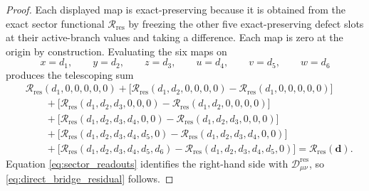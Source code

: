 \documentclass[11pt]{article}
\newcommand{\ResidualDec}{\mathcal D_{\mu\nu}^{\mathrm{res}}}
\newcommand{\ResidualRead}{\mathscr R_{\mathrm{res}}}
\begin{document}
\begin{proof}
Each displayed map is exact-preserving because it is obtained from the exact sector functional \(\ResidualRead\) by freezing the other five exact-preserving defect slots at their active-branch values and taking a difference. Each map is zero at the origin by construction. Evaluating the six maps on
\[
x=d_1,\qquad
y=d_2,\qquad
z=d_3,\qquad
u=d_4,\qquad
v=d_5,\qquad
w=d_6
\]
produces the telescoping sum
\[
\begin{aligned}
&\ResidualRead(d_1,0,0,0,0,0)
+\bigl[\ResidualRead(d_1,d_2,0,0,0,0)-\ResidualRead(d_1,0,0,0,0,0)\bigr]
\\
&\qquad
+\bigl[\ResidualRead(d_1,d_2,d_3,0,0,0)-\ResidualRead(d_1,d_2,0,0,0,0)\bigr]
\\
&\qquad
+\bigl[\ResidualRead(d_1,d_2,d_3,d_4,0,0)-\ResidualRead(d_1,d_2,d_3,0,0,0)\bigr]
\\
&\qquad
+\bigl[\ResidualRead(d_1,d_2,d_3,d_4,d_5,0)-\ResidualRead(d_1,d_2,d_3,d_4,0,0)\bigr]
\\
&\qquad
+\bigl[\ResidualRead(d_1,d_2,d_3,d_4,d_5,d_6)-\ResidualRead(d_1,d_2,d_3,d_4,d_5,0)\bigr]
=\ResidualRead(\mathbf d).
\end{aligned}
\]
Equation \eqref{eq:sector_readouts} identifies the right-hand side with \(\ResidualDec\), so \eqref{eq:direct_bridge_residual} follows.
\end{proof}
\end{document}
